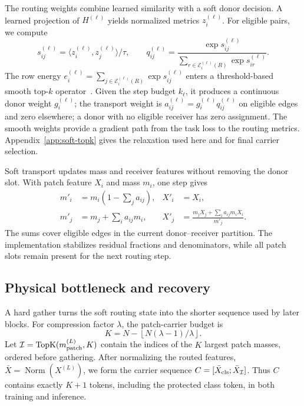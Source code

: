The routing weights combine learned similarity with a soft donor decision.
A learned projection of $H^{(\ell)}$ yields normalized metrics
$z_i^{(\ell)}$. For eligible pairs, we compute
\begin{equation}
 s_{ij}^{(\ell)}
 =\langle z_i^{(\ell)},z_j^{(\ell)}\rangle/\tau,\qquad
 q_{ij}^{(\ell)}
 =\frac{\exp s_{ij}^{(\ell)}}
 {\sum_{r\in\mathcal E_i^{(\ell)}(R)}\exp s_{ir}^{(\ell)}}.
 \label{eq:routing}
\end{equation}
The row energy
$e_i^{(\ell)}=\sum_{j\in\mathcal E_i^{(\ell)}(R)}
\exp s_{ij}^{(\ell)}$ enters a threshold-based smooth top-$k$
operator~\citep{sujianlin2024topk}. Given the step budget $k_\ell$, it
produces a continuous donor weight $g_i^{(\ell)}$; the transport weight is
$a_{ij}^{(\ell)}=g_i^{(\ell)}q_{ij}^{(\ell)}$ on eligible edges and zero
elsewhere; a donor with no eligible receiver has zero assignment. The smooth
weights provide a gradient path from the task loss to the routing metrics.
Appendix~\ref{app:soft-topk} gives the relaxation used here and for final
carrier selection.

Soft transport updates mass and receiver features without removing the
donor slot. With patch feature $X_i$ and mass $m_i$, one step gives
\begin{align}
 m'_i&=m_i\left(1-\sum_j a_{ij}\right),&
 X'_i&=X_i,\nonumber\\
 m'_j&=m_j+\sum_i a_{ij}m_i,&
 X'_j&=\frac{m_jX_j+\sum_i a_{ij}m_iX_i}{m'_j}.
 \label{eq:transport}
\end{align}
The sums cover eligible edges in the current donor--receiver partition.
The implementation stabilizes residual fractions and denominators, while
all patch slots remain present for the next routing step.

\subsection{Physical bottleneck and recovery}
A hard gather turns the soft routing state into the shorter sequence used by
later blocks. For compression factor $\lambda$, the patch-carrier budget is
\begin{equation}
 K=N-\left\lfloor N(\lambda-1)/\lambda\right\rfloor.
 \label{eq:budget}
\end{equation}
Let $\mathcal I=\operatorname{TopK}(m^{(L)}_{\rm patch},K)$ contain the indices
of the $K$ largest patch masses, ordered before gathering. After normalizing
the routed features,
$\bar X=\operatorname{Norm}(X^{(L)})$, we form the carrier sequence
$C=[\bar X_{\rm cls};\bar X_{\mathcal I}]$. Thus $C$ contains exactly
$K+1$ tokens, including the protected class token, in both training and
inference.

